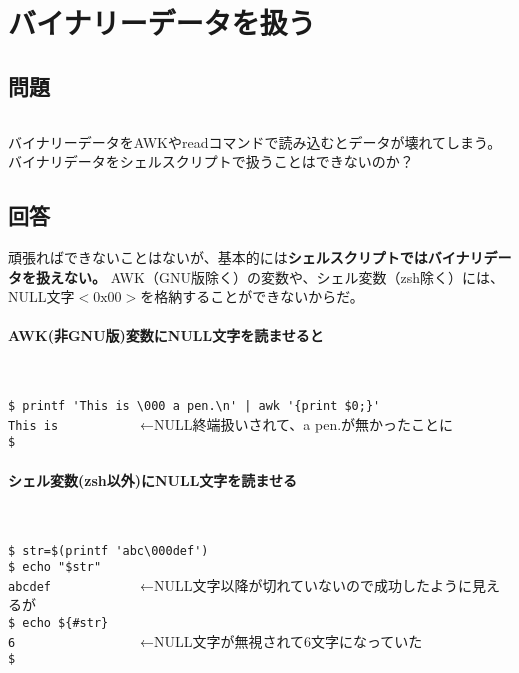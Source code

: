 \section{バイナリーデータを扱う}
\label{recipe:binary}


\subsection*{問題}
\noindent
$\!\!\!\!\!$
\begin{grshfboxit}{160.0mm}
	バイナリーデータをAWKやreadコマンドで読み込むとデータが壊れてしまう。
	バイナリデータをシェルスクリプトで扱うことはできないのか？
\end{grshfboxit}

\subsection*{回答}

頑張ればできないことはないが、基本的には\textbf{シェルスクリプトではバイナリデータを扱えない。}
AWK（GNU版除く）の変数や、シェル変数（zsh除く）には、NULL文字$<\mathrm{0x00}>$を格納することができないからだ。

\paragraph{AWK(非GNU版)変数にNULL文字を読ませると}　\\
\begin{screen}
	\verb!$ printf 'This is \000 a pen.\n' | awk '{print $0;}'! \return    \\
	\verb|This is | 　　　　　←NULL終端扱いされて、a pen.が無かったことに \\
	\verb|$ |
\end{screen}

\paragraph{シェル変数(zsh以外)にNULL文字を読ませる}　\\
\begin{screen}
	\verb!$ str=$(printf 'abc\000def')! \return                                      \\
	\verb|$ echo "$str"| \return                                                     \\
	\verb|abcdef  | 　　　　　←NULL文字以降が切れていないので成功したように見えるが \\
	\verb|$ echo ${#str}| \return                                                    \\
	\verb|6       | 　　　　　←NULL文字が無視されて6文字になっていた                \\
	\verb|$ |
\end{screen}

